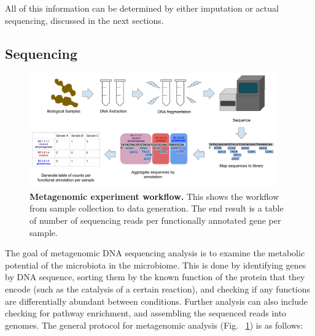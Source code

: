 All of this information can be determined by either imputation or actual sequencing, discussed in the next sections.

\subsection{Sequencing}

\begin{figure}[h]
\begin{center}
\includegraphics[width=0.95\textwidth]{Metagenomic_pipeline.png}
\caption[Metagenomic experiment workflow.]{\textbf{Metagenomic experiment workflow.} This shows the workflow from sample collection to data generation. The end result is a table of number of sequencing reads per functionally annotated gene per sample.}
\label{metagenomic_workflow}
\end{center}
\end{figure}

The goal of metagenomic DNA sequencing analysis is to examine the metabolic potential of the microbiota in the microbiome. This is done by identifying genes by DNA sequence, sorting them by the known function of the protein that they encode (such as the catalysis of a certain reaction), and checking if any functions are differentially abundant between conditions. Further analysis can also include checking for pathway enrichment, and assembling the sequenced reads into genomes. The general protocol for metagenomic analysis (Fig. ~\ref{metagenomic_workflow}) is as follows:


